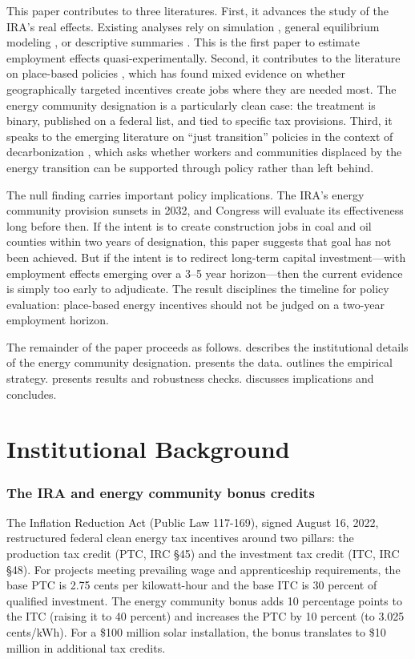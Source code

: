 \documentclass[12pt]{article}
\begin{document}
This paper contributes to three literatures. First, it advances the study of the IRA's real effects. Existing analyses rely on simulation \citep{Bistline2023}, general equilibrium modeling \citep{Rennert2024}, or descriptive summaries \citep{Treasury2024}. This is the first paper to estimate employment effects quasi-experimentally. Second, it contributes to the literature on place-based policies \citep{Kline2014, Neumark2015, Slattery2020}, which has found mixed evidence on whether geographically targeted incentives create jobs where they are needed most. The energy community designation is a particularly clean case: the treatment is binary, published on a federal list, and tied to specific tax provisions. Third, it speaks to the emerging literature on ``just transition'' policies in the context of decarbonization \citep{Vona2019, Curtis2023}, which asks whether workers and communities displaced by the energy transition can be supported through policy rather than left behind.

The null finding carries important policy implications. The IRA's energy community provision sunsets in 2032, and Congress will evaluate its effectiveness long before then. If the intent is to create construction jobs in coal and oil counties within two years of designation, this paper suggests that goal has not been achieved. But if the intent is to redirect long-term capital investment---with employment effects emerging over a 3--5 year horizon---then the current evidence is simply too early to adjudicate. The result disciplines the timeline for policy evaluation: place-based energy incentives should not be judged on a two-year employment horizon.

The remainder of the paper proceeds as follows.  describes the institutional details of the energy community designation.  presents the data.  outlines the empirical strategy.  presents results and robustness checks.  discusses implications and  concludes.


\section{Institutional Background}
\label{sec:background}

\subsubsection*{The IRA and energy community bonus credits}
The Inflation Reduction Act (Public Law 117-169), signed August 16, 2022, restructured federal clean energy tax incentives around two pillars: the production tax credit (PTC, IRC \S45) and the investment tax credit (ITC, IRC \S48). For projects meeting prevailing wage and apprenticeship requirements, the base PTC is 2.75 cents per kilowatt-hour and the base ITC is 30 percent of qualified investment. The energy community bonus adds 10 percentage points to the ITC (raising it to 40 percent) and increases the PTC by 10 percent (to 3.025 cents/kWh). For a \$100 million solar installation, the bonus translates to \$10 million in additional tax credits.
\end{document}
